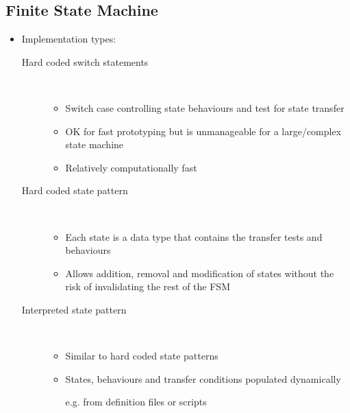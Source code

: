 \documentclass[a4paper]{article}
\begin{document}
\subsection{Finite State Machine}

\begin{itemize}
  \item
    Implementation types:

    \begin{description}
      \item[Hard coded switch statements] \hfill \\
        \begin{itemize}
          \item
            Switch case controlling state behaviours and test for state transfer

          \item
            OK for fast prototyping but is unmanageable for a large/complex state
            machine

          \item
            Relatively computationally fast

        \end{itemize}

      \item[Hard coded state pattern] \hfill \\
        \begin{itemize}
          \item
            Each state is a data type that contains the transfer tests and
            behaviours

          \item
            Allows addition, removal and modification of states without the risk
            of invalidating the rest of the FSM

        \end{itemize}

      \item[Interpreted state pattern] \hfill \\
        \begin{itemize}
          \item
            Similar to hard coded state patterns

          \item
            States, behaviours and transfer conditions populated dynamically

            e.g. from definition files or scripts


\end{itemize}
\end{description}
\end{itemize}
\end{document}
